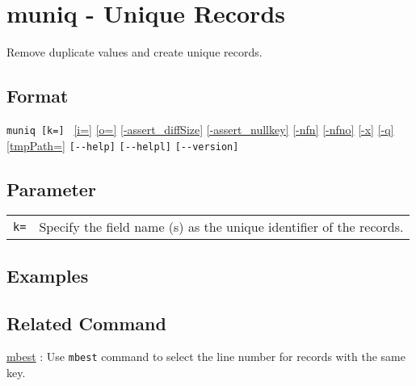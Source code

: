 
%

\section{muniq - Unique Records\label{sect:muniq}}
Remove duplicate values and create unique records. 

\subsection*{Format}
\verb|muniq [k=] |
\hyperref[sect:option_i]{[i=]}
\hyperref[sect:option_o]{[o=]}
\hyperref[sect:option_assert_diffSize]{[-assert\_diffSize]}
\hyperref[sect:option_assert_nullkey]{[-assert\_nullkey]}
\hyperref[sect:option_nfn]{[-nfn]} 
\hyperref[sect:option_nfno]{[-nfno]}  
\hyperref[sect:option_x]{[-x]}
\hyperref[sect:option_q]{[-q]}
\hyperref[sect:option_option_tmppath]{[tmpPath=]}
\verb|[--help]|
\verb|[--helpl]|
\verb|[--version]|\\

\subsection*{Parameter}
\begin{table}[htbp]
{\small
\begin{tabular}{ll}
\verb|k=|    &  Specify the field name (s) as the unique identifier of the records. \\
\end{tabular} 
}
\end{table} 

\subsection*{Examples}

\subsection*{Related Command}
\hyperref[sect:mbest]{mbest} : Use \verb|mbest| command to select the line number for records with the same key. 

%
